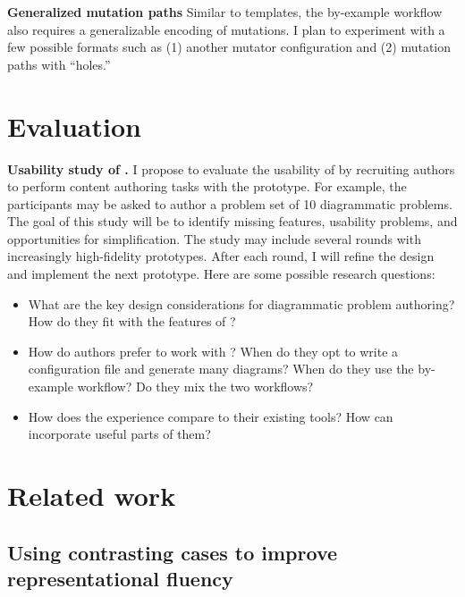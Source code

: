 \begin{proposed}
\textbf{Generalized mutation paths} Similar to templates, the by-example workflow also requires a generalizable encoding of mutations. I plan to experiment with a few possible formats such as (1) another mutator configuration and (2) mutation paths with ``holes.''
\end{proposed}

\section{Evaluation}

\begin{proposed}
\textbf{Usability study of \Edgeworth.} I propose to evaluate the usability of \Edgeworth by recruiting authors to perform content authoring tasks with the \Edgeworth prototype. For example, the participants may be asked to author a problem set of 10 diagrammatic problems. The goal of this study will be to identify missing features, usability problems, and opportunities for simplification. The study may include several rounds with increasingly high-fidelity prototypes. After each round, I will refine the design and implement the next prototype. Here are some possible research questions:
\begin{itemize}
    \item  What are the key design considerations for diagrammatic problem authoring? How do they fit with the features of \Edgeworth?
    \item How do authors prefer to work with \Edgeworth? When do they opt to write a configuration file and generate many diagrams? When do they use the by-example workflow? Do they mix the two workflows?
    \item How does the experience compare to their existing tools? How can \Edgeworth incorporate useful parts of them? 
\end{itemize}
\end{proposed}

\section{Related work}
\label{sec:edgeworth-related}

\subsection{Using contrasting cases to improve representational fluency}

